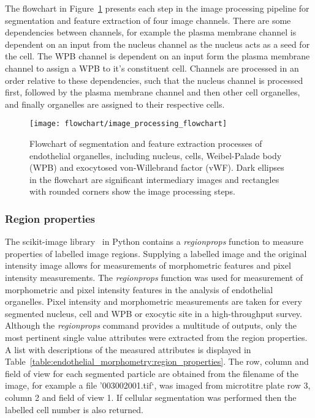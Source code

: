 The flowchart in Figure~\ref{figure:image_processing:flowchart} presents each step in the image processing pipeline for segmentation and feature extraction of four image channels. There are some dependencies between channels, for example the plasma membrane channel is dependent on an input from the nucleus channel as the nucleus acts as a seed for the cell. The WPB channel is dependent on an input form the plasma membrane channel to assign a WPB to it's constituent cell. Channels are processed in an order relative to these dependencies, such that the nucleus channel is processed first, followed by the plasma membrane channel and then other cell organelles, and finally organelles are assigned to their respective cells.

\begin{landscape}
\begin{figure}
	\centering
	\texttt{[image: flowchart/image\_processing\_flowchart]}
	\caption[Flowchart of segmentation processes of endothelial organelles]{Flowchart of segmentation and feature extraction processes of endothelial organelles, including nucleus, cells, Weibel-Palade body (WPB) and exocytosed von-Willebrand factor (vWF). Dark ellipses in the flowchart are significant intermediary images and rectangles with rounded corners show the image processing steps.}
	\label{figure:image_processing:flowchart}
\end{figure}
\end{landscape}

\subsubsection{Region properties}
\label{endothelial_morphometry:morphometric_measurements}
The scikit-image library~\cite{VanderWalt2014} in Python contains a \emph{regionprops} function to measure properties of labelled image regions. Supplying a labelled image and the original intensity image allows for measurements of morphometric features and pixel intensity measurements. The \emph{regionprops} function was used for measurement of morphometric and pixel intensity features in the analysis of endothelial organelles. Pixel intensity and morphometric measurements are taken for every segmented nucleus, cell and WPB or exocytic site in a high-throughput survey. Although the \emph{regionprops} command provides a multitude of outputs, only the most pertinent single value attributes were extracted from the region properties. A list with descriptions of the measured attributes is displayed in Table~\ref{table:endothelial_morphometry:region_properties}. The row, column and field of view for each segmented particle are obtained from the filename of the image, for example a file '003002001.tif`, was imaged from microtitre plate row 3, column 2 and field of view 1. If cellular segmentation was performed then the labelled cell number is also returned. 

